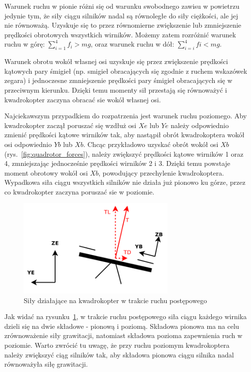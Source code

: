 Warunek ruchu w pionie różni się od warunku swobodnego zawisu w powietrzu jedynie tym, że siły ciągu silników nadal są równoległe do siły ciężkości, ale jej nie równoważą. Uzyskuje się to przez równomierne zwiększenie lub zmniejszenie prędkości obrotowych wszystkich wirników. Możemy zatem rozróżnić warunek ruchu w górę: $\sum_{i=1}^{4} f_i > mg$, oraz warunek ruchu w dół: $\sum_{i=i}^{4} fi < mg$.

Warunek obrotu wokół własnej osi uzyskuje się przez zwiększenie prędkości kątowych pary śmigieł (np. smigieł obracających się zgodnie z ruchem wskazówek zegara) i jednoczesne zmniejszenie prędkości pary śmigieł obracających się w przeciwnym kierunku. Dzięki temu momenty sił przestają się równoważyć i kwadrokopter zaczyna obracać sie wokół własnej osi.

Najciekawszym przypadkiem do rozpatrzenia jest warunek ruchu poziomego. Aby kwadrokopter zaczął poruszać się wzdłuż osi $Xe$ lub $Ye$ należy odpowiednio zmienić prędkości kątowe wirników tak, aby nastąpił obrót kwadrokoptera wokół osi odpowiednio $Yb$ lub $Xb$. Chcąc przykładowo uzyskać obrót wokół osi $Xb$ (rys.~\ref{fig:quadrotor_forces}), należy zwiększyć prędkości kątowe wirników 1 oraz 4, zmniejszając jednocześnie prędkości wirników 2 i 3. Dzięki temu powstaje moment obrotowy wokół osi $Xb$, powodujący przechylenie kwadrokoptera. Wypadkowa siła ciągu wszystkich silników nie działa już pionowo ku górze, przez co kwadrokopter zaczyna poruszać sie w poziomie. 

\begin{figure}[H]
	\centering
	\includegraphics[width=0.7\textwidth]{Pictures/quadrotor_drag_force.png}
	\caption[Dynamika ruchu postępowego]{Siły działające na kwadrokopter w trakcie ruchu postępowego}
	\label{fig:quadrotor_drag_force.png}
\end{figure}


Jak widać na rysunku~\ref{fig:quadrotor_drag_force.png}, w trakcie ruchu postępowego siła ciągu każdego wirnika dzieli się na dwie składowe - pionową i poziomą. Składowa pionowa ma na celu zrównoważenie siły grawitacji, natomiast składowa pozioma zapewnienia ruch w poziomie. Warto zwrócić tu uwagę, że przy ruchu poziomym kwadrokoptera należy zwiększyć ciąg silników tak, aby składowa pionowa ciągu silnika nadal równoważyła siłę grawitacji.

